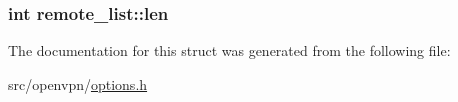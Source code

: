\subsubsection[{len}]{\setlength{\rightskip}{0pt plus 5cm}int remote\+\_\+list\+::len}\label{structremote__list_a36d74d8ccf19fbb642d2e307d14e3265}


The documentation for this struct was generated from the following file\+:\begin{DoxyCompactItemize}
\item 
src/openvpn/\hyperlink{options_8h}{options.\+h}\end{DoxyCompactItemize}
